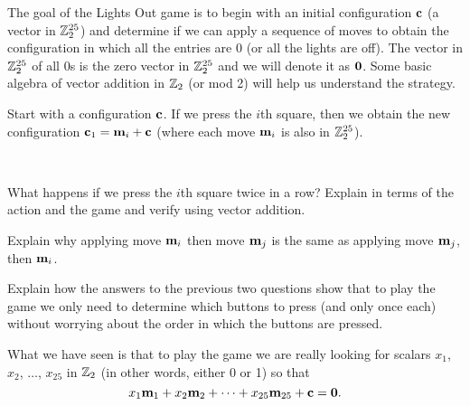 The goal of the Lights Out game is to begin with an initial configuration $\mathbf{c}$ (a vector in $\mathbb{Z}_2^{25}$) and determine if we can apply a sequence of moves to obtain the configuration in which all the entries are 0 (or all the lights are off). The vector in $\mathbb{Z}_2^{25}$ of all 0s is the zero vector in $\mathbb{Z}_2^{25}$ and we will denote it as $\mathbf{0}$. Some basic algebra of vector addition in $\mathbb{Z}_2$ (or mod 2) will help us understand the strategy.

Start with a configuration $\mathbf{c}$. If we press the $i$th square, then we obtain the new configuration $\mathbf{c}_1 = \mathbf{m}_i + \mathbf{c}$ (where each move $\mathbf{m}_i$ is also in $\mathbb{Z}_2^{25}$).

\begin{pactivity} \label{act_LO_1} ~
\ba
\item What happens if we press the $i$th square twice in a row? Explain in terms of the action and the game and verify using vector addition.


\item Explain why applying move $\mathbf{m}_i$ then move $\mathbf{m}_j$ is the same as applying move $\mathbf{m}_j$, then $\mathbf{m}_i$.


\item Explain how the answers to the previous two questions show that to play the game we only need to determine which buttons to press (and only once each) without worrying about the order in which the buttons are pressed.


\ea

\end{pactivity}



What we have seen is that to play the game we are really looking for scalars $x_1$, $x_2$, $\ldots$, $x_{25}$ in $\mathbb{Z}_2$ (in other words, either 0 or 1) so that
\begin{equation}
x_1\mathbf{m}_1 + x_2\mathbf{m}_2 + \cdots + x_{25}\mathbf{m}_{25} + \mathbf{c} = \mathbf{0}. \label{eq:LO1}
\end{equation}



